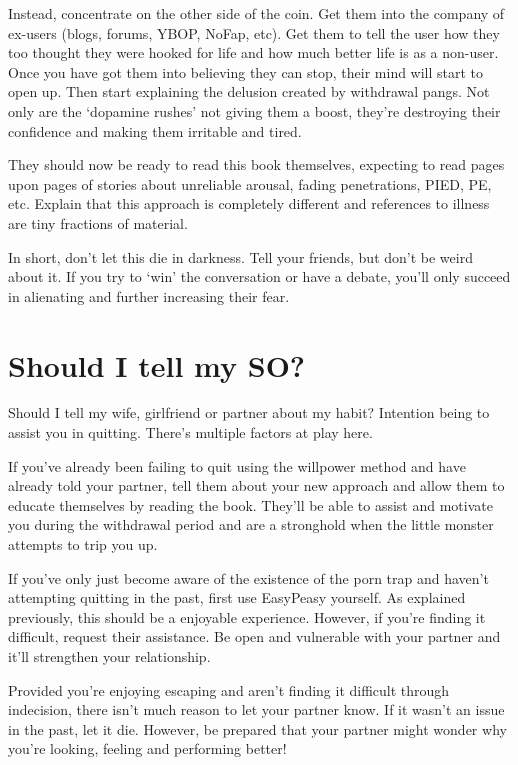 \documentclass[
]{book}
\begin{document}
Instead, concentrate on the other side of the coin. Get them into the company of ex-users (blogs, forums, YBOP, NoFap, etc). Get them to tell the user how they too thought they were hooked for life and how much better life is as a non-user. Once you have got them into believing they can stop, their mind will start to open up. Then start explaining the delusion created by withdrawal pangs. Not only are the `dopamine rushes' not giving them a boost, they're destroying their confidence and making them irritable and tired.

They should now be ready to read this book themselves, expecting to read pages upon pages of stories about unreliable arousal, fading penetrations, PIED, PE, etc. Explain that this approach is completely different and references to illness are tiny fractions of material.

In short, don't let this die in darkness. Tell your friends, but don't be weird about it. If you try to `win' the conversation or have a debate, you'll only succeed in alienating and further increasing their fear.

\hypertarget{should-i-tell-my-so}{%
\section{Should I tell my SO?}\label{should-i-tell-my-so}}

Should I tell my wife, girlfriend or partner about my habit? Intention being to assist you in quitting. There's multiple factors at play here.

If you've already been failing to quit using the willpower method and have already told your partner, tell them about your new approach and allow them to educate themselves by reading the book. They'll be able to assist and motivate you during the withdrawal period and are a stronghold when the little monster attempts to trip you up.

If you've only just become aware of the existence of the porn trap and haven't attempting quitting in the past, first use EasyPeasy yourself. As explained previously, this should be a enjoyable experience. However, if you're finding it difficult, request their assistance. Be open and vulnerable with your partner and it'll strengthen your relationship.

Provided you're enjoying escaping and aren't finding it difficult through indecision, there isn't much reason to let your partner know. If it wasn't an issue in the past, let it die. However, be prepared that your partner might wonder why you're looking, feeling and performing better!
\end{document}
